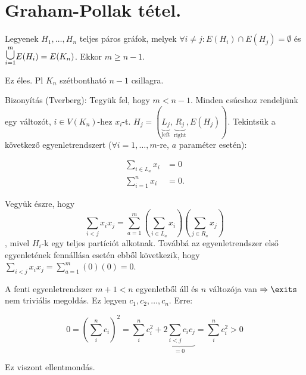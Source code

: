 \chapter{Graham-Pollak tétel.}

\begin{thm}
  Legyenek $H_1, \dots, H_n$ teljes páros gráfok, melyek $\forall i \not = j: E(H_i) \cap E(H_j) = \emptyset$ és $\cuploop{m}{i=1} E(H_i) = E(K_n)$. Ekkor $m \geq n - 1$.
\end{thm}

\begin{obs}
  Ez éles. Pl $K_n$ szétbontható $n-1$ csillagra.
\end{obs}

Bizonyítás (Tverberg):
Tegyük fel, hogy $m < n-1$. Minden csúcshoz rendeljünk egy változót, $i \in V(K_n)$-hez $x_i$-t. $H_j = (\underbrace{L_j}_{\text{left}}, \underbrace{R_j}_{\text{right}}, E(H_j))$. Tekintsük a következő egyenletrendszert ($\forall i=1, \dots , m$-re, $a$ paraméter esetén):

\begin{align}
  \sum_{i \in L_a} x_i &= 0 \\
  \sum_{i = 1}^{n} x_i &= 0.
\end{align}

Vegyük észre, hogy $$\sum_{i < j} x_i x_j = \sum_{a=1}^m \left(\sum_{i \in L_a} x_i\right) \left(\sum_{j \in R_a} x_j\right)$$, mivel $H_i$-k egy teljes partíciót alkotnak. Továbbá az egyenletrendszer első egyenletének fennállása esetén ebből következik, hogy $\sum_{i < j} x_i x_j = \sum_{a=1}^m (0) (0) = 0$.

\medskip

A fenti egyenletrendszer $m+1 < n$ egyenletből áll és $n$ változója van $\Rightarrow \exits$ nem triviális megoldás. Ez legyen $c_1, c_2, \dots, c_n$. Erre:

\[0 = \left(\sum_i^n c_i \right)^2 = \sum_i^n c_i^2 + \underbrace{2\sum_{i < j} c_i c_j}_{=0} = \sum_i^n c_i^2 > 0\]

Ez viszont ellentmondás. \QED
